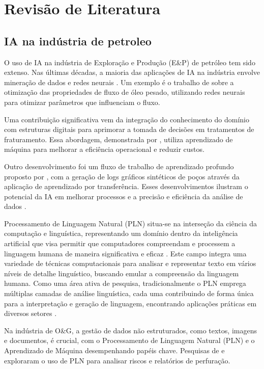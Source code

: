 
\chapter{Revisão de Literatura} 

    \section{IA na indústria de petroleo}
    
        O uso de IA na indústria de Exploração e Produção (E\&P) de petróleo tem sido extenso. Nas últimas décadas, a maioria das aplicações de IA na indústria envolve mineração de dados e redes neurais \cite{Bravo2014}. Um exemplo é o trabalho de \cite{Gudala2021} sobre a otimização das propriedades de fluxo de óleo pesado, utilizando redes neurais para otimizar parâmetros que influenciam o fluxo.
        
        Uma contribuição significativa vem da integração do conhecimento do domínio com estruturas digitais para aprimorar a tomada de decisões em tratamentos de fraturamento. Essa abordagem, demonstrada por \cite{Khan2024}, utiliza aprendizado de máquina para melhorar a eficiência operacional e reduzir custos.
        
        Outro desenvolvimento foi um fluxo de trabalho de aprendizado profundo proposto por \cite{Gohari2024}, com a geração de logs gráficos sintéticos de poços através da aplicação de aprendizado por transferência. Esses desenvolvimentos ilustram o potencial da IA em melhorar processos e a precisão e eficiência da análise de dados \cite{Rahmani2021}.
        
        Processamento de Linguagem Natural (PLN) situa-se na interseção da ciência da computação e linguística, representando um domínio dentro da inteligência artificial que visa permitir que computadores compreendam e processem a linguagem humana de maneira significativa e eficaz \cite{Liddy2001}. Este campo integra uma variedade de técnicas computacionais para analisar e representar texto em vários níveis de detalhe linguístico, buscando emular a compreensão da linguagem humana. Como uma área ativa de pesquisa, tradicionalmente o PLN emprega múltiplas camadas de análise linguística, cada uma contribuindo de forma única para a interpretação e geração de linguagem, encontrando aplicações práticas em diversos setores \cite{Liddy2001}.
        
        Na indústria de O\&G, a gestão de dados não estruturados, como textos, imagens e documentos, é crucial, com o Processamento de Linguagem Natural (PLN) e o Aprendizado de Máquina desempenhando papéis chave. Pesquisas de \cite{Antoniak2016} e \cite{Castineira2018} exploraram o uso de PLN para analisar riscos e relatórios de perfuração.
    
